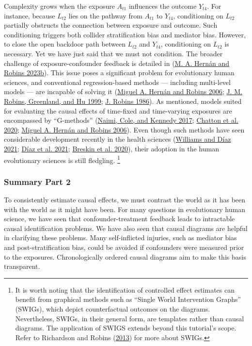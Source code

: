 \documentclass[
  singlecolumn]{article}
\begin{document}
Complexity grows when the exposure \(A_{t1}\) influences the outcome
\(Y_{t4}\). For instance, because \(L_{t2}\) lies on the pathway from
\(A_{t1}\) to \(Y_{t4}\), conditioning on \(L_{t2}\) partially obstructs
the connection between exposure and outcome. Such conditioning triggers
both collider stratification bias and mediator bias. However, to close
the open backdoor path between \(L_{t2}\) and \(Y_{t4}\), conditioning
on \(L_{t2}\) is necessary. Yet we have just said that we must not
condition. The broader challenge of exposure-confounder feedback is
detailed in (\protect\hyperlink{ref-hernuxe1n2023a}{M. A. Hernán and
Robins 2023b}). This issue poses a significant problem for evolutionary
human sciences, and conventional regression-based methods --- including
multi-level models --- are incapable of solving it
(\protect\hyperlink{ref-hernuxe1n2006}{Miguel A. Hernán and Robins
2006}; \protect\hyperlink{ref-robins1999}{J. M. Robins, Greenland, and
Hu 1999}; \protect\hyperlink{ref-robins1986}{J. Robins 1986}). As
mentioned, models suited for evaluating the causal effects of time-fixed
and time-varying exposures are encompassed by ``G-methods''
(\protect\hyperlink{ref-naimi2017}{Naimi, Cole, and Kennedy 2017};
\protect\hyperlink{ref-chatton2020}{Chatton et al. 2020};
\protect\hyperlink{ref-hernuxe1n2006}{Miguel A. Hernán and Robins
2006}). Even though such methods have seen considerable development
recently in the health sciences
(\protect\hyperlink{ref-williams2021}{Williams and Díaz 2021};
\protect\hyperlink{ref-duxedaz2021}{Díaz et al. 2021};
\protect\hyperlink{ref-breskin2020}{Breskin et al. 2020}), their
adoption in the human evolutionary sciences is still fledgling.
\footnote{It is worth noting that the identification of controlled
  effect estimates can benefit from graphical methods such as ``Single
  World Intervention Graphs'' (SWIGs), which depict counterfactual
  outcomes on the diagrams. Nevertheless, SWIGs, in their general form,
  are templates rather than causal diagrams. The application of SWIGS
  extends beyond this tutorial's scope. Refer to Richardson and Robins
  (\protect\hyperlink{ref-richardson2013}{2013}) for more about SWIGs.}

\hypertarget{summary-part-2}{%
\subsubsection{Summary Part 2}\label{summary-part-2}}

To consistently estimate causal effects, we must contrast the world as
it has been with the world as it might have been. For many questions in
evolutionary human science, we have seen that confounder-treatment
feedback leads to intractable causal identification problems. We have
also seen that causal diagrams are helpful in clarifying these problems.
Many self-inflicted injuries, such as mediator bias and
post-stratification bias, could be avoided if confounders were measured
prior to the exposures. Chronologically ordered causal diagrams aim to
make this basis transparent.
\end{document}
